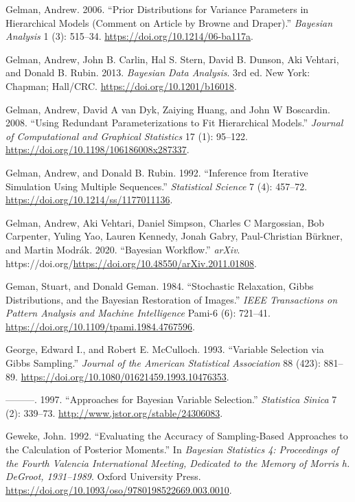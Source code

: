 \documentclass[
  11pt,
  letterpaper,
]{scrbook}
\newlength{\cslhangindent}
\newenvironment{CSLReferences}[2] %
 {\begin{list}{}{%
  \setlength{\itemindent}{0pt}
  \setlength{\leftmargin}{0pt}
  \setlength{\parsep}{0pt}
  \ifodd #1
   \setlength{\leftmargin}{\cslhangindent}
   \setlength{\itemindent}{-1\cslhangindent}
  \fi
  \setlength{\itemsep}{#2\baselineskip}}}
 {\end{list}}
\theoremstyle{plain}
\theoremstyle{plain}
\theoremstyle{plain}
\theoremstyle{definition}
\theoremstyle{definition}
\theoremstyle{definition}
\theoremstyle{remark}
\begin{document}
\begin{CSLReferences}{1}{0}
Gelman, Andrew. 2006. {``Prior Distributions for Variance Parameters in
Hierarchical Models (Comment on Article by {B}rowne and {D}raper).''}
\emph{Bayesian Analysis} 1 (3): 515--34.
\url{https://doi.org/10.1214/06-ba117a}.

Gelman, Andrew, John B. Carlin, Hal S. Stern, David B. Dunson, Aki
Vehtari, and Donald B. Rubin. 2013. \emph{Bayesian Data Analysis}. 3rd
ed. New York: Chapman; Hall/CRC. \url{https://doi.org/10.1201/b16018}.

Gelman, Andrew, David A van Dyk, Zaiying Huang, and John W Boscardin.
2008. {``Using Redundant Parameterizations to Fit Hierarchical
Models.''} \emph{Journal of Computational and Graphical Statistics} 17
(1): 95--122. \url{https://doi.org/10.1198/106186008x287337}.

Gelman, Andrew, and Donald B. Rubin. 1992. {``Inference from Iterative
Simulation Using Multiple Sequences.''} \emph{Statistical Science} 7
(4): 457--72. \url{https://doi.org/10.1214/ss/1177011136}.

Gelman, Andrew, Aki Vehtari, Daniel Simpson, Charles C Margossian, Bob
Carpenter, Yuling Yao, Lauren Kennedy, Jonah Gabry, Paul-Christian
Bürkner, and Martin Modrák. 2020. {``Bayesian Workflow.''} \emph{arXiv}.
https://doi.org/\url{https://doi.org/10.48550/arXiv.2011.01808}.

Geman, Stuart, and Donald Geman. 1984. {``Stochastic Relaxation, {G}ibbs
Distributions, and the {B}ayesian Restoration of Images.''} \emph{IEEE
Transactions on Pattern Analysis and Machine Intelligence} Pami-6 (6):
721--41. \url{https://doi.org/10.1109/tpami.1984.4767596}.

George, Edward I., and Robert E. McCulloch. 1993. {``Variable Selection
via {G}ibbs Sampling.''} \emph{Journal of the American Statistical
Association} 88 (423): 881--89.
\url{https://doi.org/10.1080/01621459.1993.10476353}.

---------. 1997. {``Approaches for {B}ayesian Variable Selection.''}
\emph{Statistica Sinica} 7 (2): 339--73.
\url{http://www.jstor.org/stable/24306083}.

Geweke, John. 1992. {``Evaluating the Accuracy of Sampling-Based
Approaches to the Calculation of Posterior Moments.''} In \emph{Bayesian
Statistics 4: Proceedings of the Fourth Valencia International Meeting,
Dedicated to the Memory of Morris h. DeGroot, 1931--1989}. Oxford
University Press.
\url{https://doi.org/10.1093/oso/9780198522669.003.0010}.


\end{CSLReferences}
\end{document}
